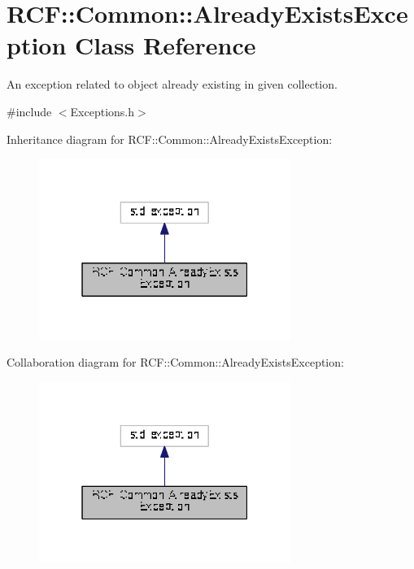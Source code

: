 \hypertarget{class_r_c_f_1_1_common_1_1_already_exists_exception}{}\section{R\+C\+F\+:\+:Common\+:\+:Already\+Exists\+Exception Class Reference}
\label{class_r_c_f_1_1_common_1_1_already_exists_exception}


An exception related to object already existing in given collection.  




{\ttfamily \#include $<$Exceptions.\+h$>$}



Inheritance diagram for R\+C\+F\+:\+:Common\+:\+:Already\+Exists\+Exception\+:\nopagebreak
\begin{figure}[H]
\begin{center}
\leavevmode
\includegraphics[width=232pt]{class_r_c_f_1_1_common_1_1_already_exists_exception__inherit__graph}
\end{center}
\end{figure}


Collaboration diagram for R\+C\+F\+:\+:Common\+:\+:Already\+Exists\+Exception\+:\nopagebreak
\begin{figure}[H]
\begin{center}
\leavevmode
\includegraphics[width=232pt]{class_r_c_f_1_1_common_1_1_already_exists_exception__coll__graph}
\end{center}
\end{figure}

